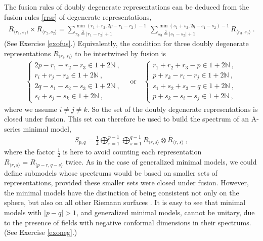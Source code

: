 \documentclass[12pt,a4paper,notitlepage]{report}
\numberwithin{equation}{section}
\theoremstyle{break}
\begin{document}
The fusion rules of doubly degenerate representations can be deduced from the fusion rules \eqref{rrsr} of degenerate representations, 
\begin{align}
  \boxed{R_{\langle r_1,s_1 \rangle} \times R_{\langle r_2,s_2 \rangle} = \sum_{r_3\overset{2}{=}|r_1-r_2|+1}^{\min(r_1+r_2,2p-r_1-r_2)-1}\ \sum_{s_3\overset{2}{=}|s_1-s_2|+1}^{\min(s_1+s_2,2q-s_1-s_2)-1} R_{\langle r_3,s_3 \rangle}}\ .
\label{rrmm}
\end{align}
(See Exercise \ref{exofus}.) Equivalently, 
the condition for three doubly degenerate representations $R_{\langle r_i,s_i \rangle}$ to be intertwined by fusion is 
\begin{align}
 \left\{\begin{array}{l}  2p-r_1-r_2-r_3\in 1+2{\mathbb{N}}\ , \\
 r_i+r_j-r_k \in 1 + 2{\mathbb{N}}\ , \\
2q-s_1-s_2-s_3\in 1+2{\mathbb{N}}\ , \\
 s_i+s_j-s_k \in 1 + 2{\mathbb{N}}\ , \end{array}\right.  
\quad \text{or} \quad
 \left\{\begin{array}{l}  r_1+r_2+r_3-p\in 1+2{\mathbb{N}}\ , \\
 p+r_k-r_i-r_j\in 1+2{\mathbb{N}} \ , \\
s_1+s_2+s_3-q\in 1+2{\mathbb{N}}\ , \\
 p+s_k-s_i-s_j\in 1+2{\mathbb{N}} \ ,\end{array}\right. 
\end{align}
where we assume $i\neq j\neq k$.
So the set of the doubly degenerate representations is closed under fusion.
This set can therefore be used to build the spectrum of an A-series minimal model,
\begin{align}
 \boxed{ S_{p,q} = \frac12 \bigoplus_{r=1}^{p-1} \bigoplus_{s=1}^{q-1} R_{\langle r,s \rangle}\otimes \bar{R}_{\langle r,s \rangle} } \ ,
\label{smin}
\end{align}
where the factor $\frac12$ is here to avoid counting each representation $R_{\langle r,s \rangle}=R_{\langle p-r,q-s \rangle}$ twice.
As in the case of generalized minimal models, we could define submodels whose spectrums would be based on smaller sets of representations, provided these smaller sets were closed under fusion.
However, the minimal models have the distinction of being consistent not only on the sphere, but also on all other Riemann surfaces \cite{fms97}.
It is easy to see that minimal models with $|p-q|>1$, and generalized minimal models, cannot be unitary, due to the presence of fields with negative conformal dimensions in their spectrums. (See Exercise \ref{exoneg}.)
\end{document}
